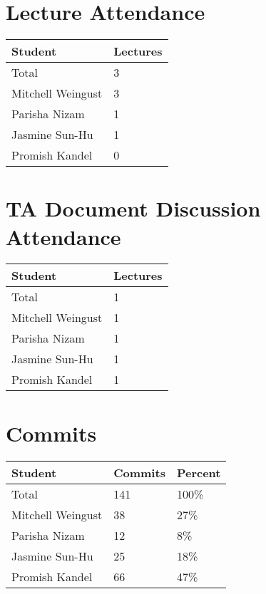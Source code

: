 \documentclass{article}
\begin{document}

\section{Lecture Attendance}

\begin{table}[H]
\centering
\begin{tabular}{ll}
\toprule
\textbf{Student} & \textbf{Lectures}\\
\midrule
Total & 3\\
Mitchell Weingust & 3\\
Parisha Nizam & 1\\
Jasmine Sun-Hu & 1\\
Promish Kandel & 0\\
\bottomrule
\end{tabular}
\end{table}


\section{TA Document Discussion Attendance}

\begin{table}[H]
\centering
\begin{tabular}{ll}
\toprule
\textbf{Student} & \textbf{Lectures}\\
\midrule
Total & 1\\
Mitchell Weingust & 1\\
Parisha Nizam & 1\\
Jasmine Sun-Hu & 1\\
Promish Kandel & 1\\
\bottomrule
\end{tabular}
\end{table}

\section{Commits}

\begin{table}[H]
\centering
\begin{tabular}{lll}
\toprule
\textbf{Student} & \textbf{Commits} & \textbf{Percent}\\
\midrule
Total & 141 & 100\% \\
Mitchell Weingust & 38 & 27\% \\
Parisha Nizam & 12 & 8\% \\
Jasmine Sun-Hu & 25 & 18\% \\
Promish Kandel & 66 & 47\% \\
\bottomrule
\end{tabular}
\end{table}
\end{document}
